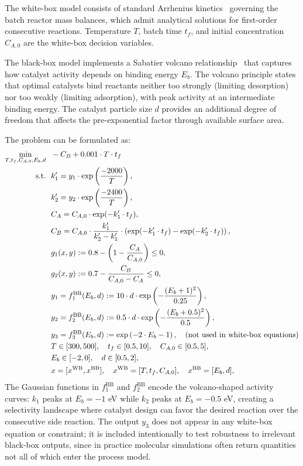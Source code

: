 \documentclass[12pt,a4paper]{article}%
\theoremstyle{plain}%
\theoremstyle{remark}%
\theoremstyle{definition}%
\def\WB{\mathrm{WB}}
\def\BB{\mathrm{BB}}
\begin{document}
\begin{appendices}
The white-box model consists of standard Arrhenius kinetics~\cite{fogler2016elements} governing the batch reactor mass balances, which admit analytical solutions for first-order consecutive reactions. Temperature $T$, batch time $t_f$, and initial concentration $C_{A,0}$ are the white-box decision variables.

The black-box model implements a Sabatier volcano relationship~\cite{motagamwala2021microkinetic,ooka2021sabatier,wodrich2024microkinetic} that captures how catalyst activity depends on binding energy $E_b$. The volcano principle states that optimal catalysts bind reactants neither too strongly (limiting desorption) nor too weakly (limiting adsorption), with peak activity at an intermediate binding energy. The catalyst particle size $d$ provides an additional degree of freedom that affects the pre-exponential factor through available surface area.

The problem can be formulated as:
\begin{align} \label{eq:BatchReactor}
    \min_{T, t_f, C_{A,0}, E_b, d} &~~ -C_B + 0.001 \cdot T \cdot t_f \\\notag
    \text{s.t.} &~~ k_1' = y_1 \cdot \exp\left(\frac{-2000}{T}\right), \\\notag
    &~~ k_2' = y_2 \cdot \exp\left(\frac{-2400}{T}\right), \\\notag
    &~~ C_A = C_{A,0} \cdot \exp(-k_1' \cdot t_f), \\\notag
    &~~ C_B = C_{A,0} \cdot \frac{k_1'}{k_2' - k_1'} \cdot \left(\exp(-k_1' \cdot t_f) - \exp(-k_2' \cdot t_f)\right), \\\notag
    &~~ g_1(x, y) := 0.8 - \left(1 - \frac{C_A}{C_{A,0}}\right) \leq 0, \\\notag
    &~~ g_2(x, y) := 0.7 - \frac{C_B}{C_{A,0} - C_A} \leq 0, \\\notag
    &~~ y_1 = f^\BB_1(E_b, d) := 10 \cdot d \cdot \exp\left(-\frac{(E_b + 1)^2}{0.25}\right), \\\notag
    &~~ y_2 = f^\BB_2(E_b, d) := 0.5 \cdot d \cdot \exp\left(-\frac{(E_b + 0.5)^2}{0.5}\right), \\\notag
    &~~ y_3 = f^\BB_3(E_b, d) := \exp\left(-2 \cdot E_b - 1\right), \quad \text{(not used in white-box equations)} \\\notag
    &~~ T \in [300, 500], \quad t_f \in [0.5, 10], \quad C_{A,0} \in [0.5, 5], \\\notag
    &~~ E_b \in [-2, 0], \quad d \in [0.5, 2], \\\notag
    &~~ x = [x^{\WB}, x^{\BB}], \quad x^{\WB} = [T, t_f, C_{A,0}], \quad x^{\BB} = [E_b, d],
\end{align}
The Gaussian functions in $f^\BB_1$ and $f^\BB_2$ encode the volcano-shaped activity curves: $k_1$ peaks at $E_b = -1$ eV while $k_2$ peaks at $E_b = -0.5$ eV, creating a selectivity landscape where catalyst design can favor the desired reaction over the consecutive side reaction. The output $y_3$ does not appear in any white-box equation or constraint; it is included intentionally to test robustness to irrelevant black-box outputs, since in practice molecular simulations often return quantities not all of which enter the process model.


\end{appendices}
\end{document}
